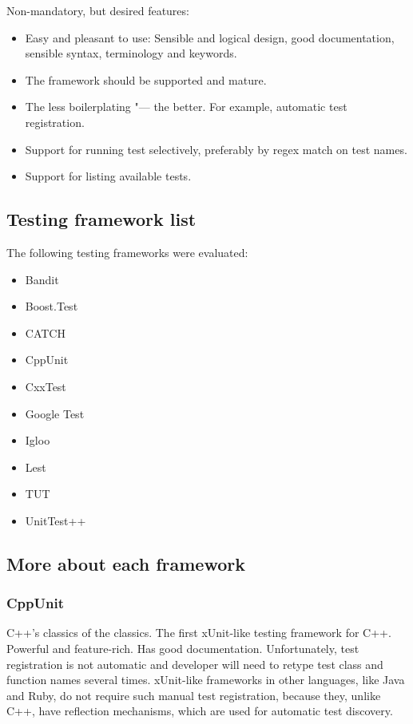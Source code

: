 \documentclass[10pt, a5paper]{article}
\begin{document}
Non-mandatory, but desired features:

\begin{itemize}
  \item Easy and pleasant to use: Sensible and logical design, good \linebreak documentation, sensible syntax, terminology and keywords.
  \item The framework should be supported and mature.
  \item The less boilerplating "--- the better. For example, automatic test registration.
  \item Support for running test selectively, preferably by regex match on test names.
  \item Support for listing available tests.
\end{itemize}

\subsection*{Testing framework list}

The following testing frameworks were evaluated:

\begin{itemize}
  \item Bandit
  \item Boost.Test
  \item CATCH
  \item CppUnit
  \item CxxTest
  \item Google Test
  \item Igloo
  \item Lest
  \item TUT
  \item UnitTest++
\end{itemize}

\subsection*{More about each framework}

\subsubsection*{CppUnit}

C++'s classics of the classics. The first xUnit-like testing framework for C++. Powerful and feature-rich. Has good documentation. \linebreak Unfortunately, test registration is not automatic and developer will need to retype test class and function names several times. xUnit-like frameworks in other languages, like Java and Ruby, do not require such manual test registration, because they, unlike C++, have reflection mechanisms, which are used for automatic test discovery.
\end{document}
